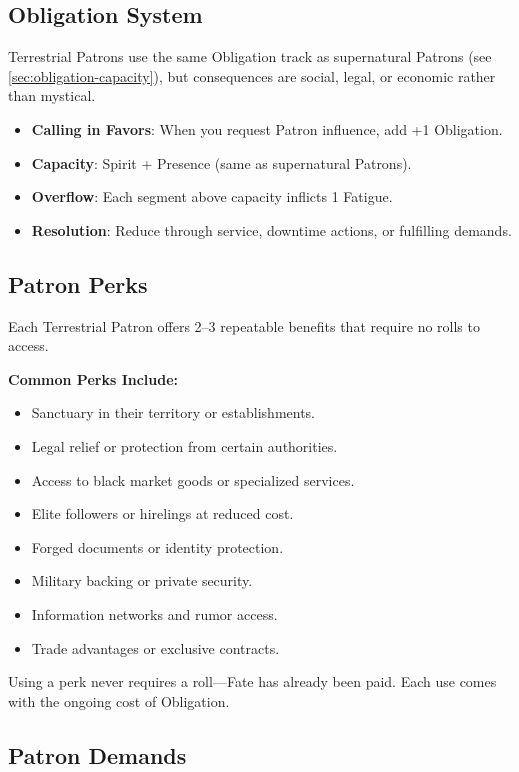 \subsection{Obligation System}
\label{sec:terrestrial-obligation}

Terrestrial Patrons use the same Obligation track as supernatural Patrons (see \ref{sec:obligation-capacity}), but consequences are social, legal, or economic rather than mystical.

\begin{itemize}
    \item \textbf{Calling in Favors}: When you request Patron influence, add +1 Obligation.
    \item \textbf{Capacity}: Spirit + Presence (same as supernatural Patrons).
    \item \textbf{Overflow}: Each segment above capacity inflicts 1 Fatigue.
    \item \textbf{Resolution}: Reduce through service, downtime actions, or fulfilling demands.
\end{itemize}

\subsection{Patron Perks}
\label{sec:terrestrial-perks}

Each Terrestrial Patron offers 2–3 repeatable benefits that require no rolls to access.

\textbf{Common Perks Include:}
\begin{itemize}
    \item Sanctuary in their territory or establishments.
    \item Legal relief or protection from certain authorities.
    \item Access to black market goods or specialized services.
    \item Elite followers or hirelings at reduced cost.
    \item Forged documents or identity protection.
    \item Military backing or private security.
    \item Information networks and rumor access.
    \item Trade advantages or exclusive contracts.
\end{itemize}
Using a perk never requires a roll—Fate has already been paid. Each use comes with the ongoing cost of Obligation.

\subsection{Patron Demands}
\label{sec:terrestrial-demands}

